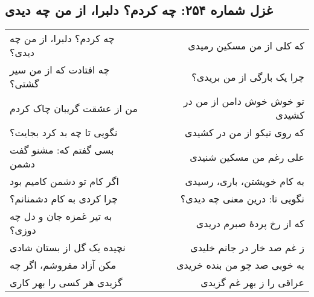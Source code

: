 \begin{center}
\section*{غزل شماره ۲۵۴: چه کردم؟ دلبرا، از من چه دیدی}
\label{sec:254}
\begin{longtable}{l p{0.5cm} r}
چه کردم؟ دلبرا، از من چه دیدی؟
&&
که کلی از من مسکین رمیدی
\\
چه افتادت که از من سیر گشتی؟
&&
چرا یک بارگی از من بریدی؟
\\
من از عشقت گریبان چاک کردم
&&
تو خوش خوش دامن از من در کشیدی
\\
نگویی تا چه بد کرد بجایت؟
&&
که روی نیکو از من در کشیدی
\\
بسی گفتم که: مشنو گفت دشمن
&&
علی رغم من مسکین شنیدی
\\
اگر کام تو دشمن کامیم بود
&&
به کام خویشتن، باری، رسیدی
\\
چرا کردی به کام دشمنانم؟
&&
نگویی تا: درین معنی چه دیدی؟
\\
به تیر غمزه جان و دل چه دوزی؟
&&
که از رخ پردهٔ صبرم دریدی
\\
نچیده یک گل از بستان شادی
&&
ز غم صد خار در جانم خلیدی
\\
مکن آزاد مفروشم، اگر چه
&&
به خوبی صد چو من بنده خریدی
\\
گزیدی هر کسی را بهر کاری
&&
عراقی را ز بهر غم گزیدی
\\
\end{longtable}
\end{center}

